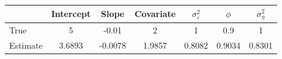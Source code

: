\begin{tabular}{lcccccc}
\toprule
& Intercept & Slope & Covariate & $\sigma_\varepsilon^2$ & $\phi$ & $\sigma_\eta^2$ \\
\midrule
True & 5 & -0.01 & 2 & 1 & 0.9 & 1 \\
Estimate & 3.6893 & -0.0078 & 1.9857 & 0.8082 & 0.9034 & 0.8301 \\
\bottomrule
\end{tabular}
